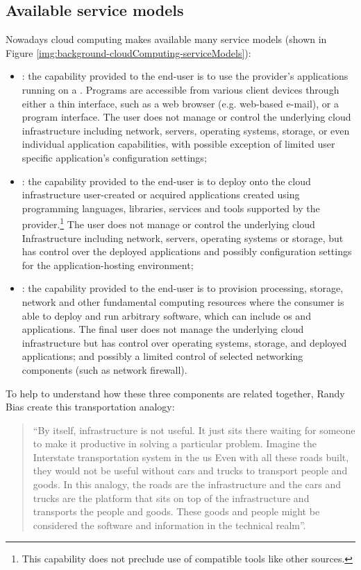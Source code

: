 \subsection*{Available service models}
\label{sec:background-cloudComputing-cloudServiceModels}
Nowadays cloud computing makes available many service models (shown in Figure
\ref{img:background-cloudComputing-serviceModels}):

\begin{itemize}
	\item{: the capability provided to the end-user is to use the provider's
		applications running on a . Programs are accessible from various
		client devices through either a thin interface, such as a web browser (e.g. web-based e-mail),
		or a program interface. The user does not manage or control the underlying cloud infrastructure
		including network, servers, operating systems, storage, or even individual application capabilities,
		with possible exception of limited user specific application's configuration settings;}
	\item{: the capability provided to the end-user is to deploy onto the cloud
		infrastructure user-created or acquired applications created using programming languages,
		libraries, services and tools supported by the provider.\footnote{This capability does not preclude
		use of compatible tools like other sources.} The user does not manage or control the underlying
		cloud Infrastructure including network, servers, operating systems or storage, but has control
		over the deployed applications and possibly configuration settings for the application-hosting
		environment;}
	\item{: the capability provided to the end-user is to provision processing, storage,
		network and other fundamental computing resources where the consumer is able to deploy and run
		arbitrary software, which can include \acs{os} and applications. The final user does not
		manage the underlying cloud infrastructure but has control over operating systems, storage, and
		deployed applications; and possibly a limited control of selected networking components (such as
		network firewall).}
\end{itemize}

To help to understand how these three components are related together, Randy Bias \cite{differenceIaasPaas}
create this transportation analogy:

\begin{quote}
	``By itself, infrastructure is not useful. It just sits there waiting for someone to make it productive in
	solving a particular problem. Imagine the Interstate transportation system in the \acs{us} Even with all
	these roads built, they would not be useful without cars and trucks to transport people and goods. In this
	analogy, the roads are the infrastructure and the cars and trucks are the platform that sits on top of the
	infrastructure and transports the people and goods. These goods and people might be considered the software
	and information in the technical realm''.
\end{quote}

